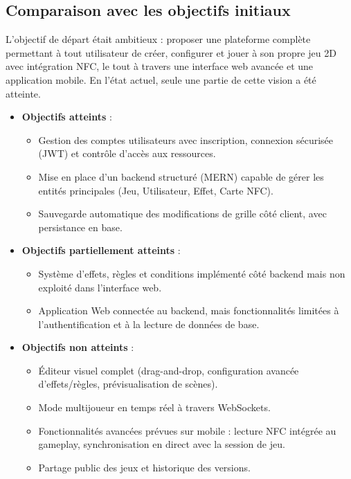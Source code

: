 \documentclass[12pt]{article}        %
\begin{document}
\subsection{Comparaison avec les objectifs initiaux}
\label{subsec:Comparaison}

L’objectif de départ était ambitieux : proposer une plateforme complète permettant à tout utilisateur de créer, configurer et jouer à son propre jeu 2D avec intégration NFC, le tout à travers une interface web avancée et une application mobile.  
En l’état actuel, seule une partie de cette vision a été atteinte.

\begin{itemize}
  \item \textbf{Objectifs atteints} :
  \begin{itemize}
    \item Gestion des comptes utilisateurs avec inscription, connexion sécurisée (JWT) et contrôle d’accès aux ressources.
    \item Mise en place d’un backend structuré (MERN) capable de gérer les entités principales (Jeu, Utilisateur, Effet, Carte NFC).
    \item Sauvegarde automatique des modifications de grille côté client, avec persistance en base.
  \end{itemize}

  \item \textbf{Objectifs partiellement atteints} :
  \begin{itemize}
    \item Système d’effets, règles et conditions implémenté côté backend mais non exploité dans l’interface web.
    \item Application Web connectée au backend, mais fonctionnalités limitées à l’authentification et à la lecture de données de base.
  \end{itemize}

    \item \textbf{Objectifs non atteints} :
  \begin{itemize}
    \item Éditeur visuel complet (drag-and-drop, configuration avancée d’effets/règles, prévisualisation de scènes).
    \item Mode multijoueur en temps réel à travers WebSockets.
    \item Fonctionnalités avancées prévues sur mobile : lecture NFC intégrée au gameplay, synchronisation en direct avec la session de jeu.
    \item Partage public des jeux et historique des versions.
  \end{itemize}
\end{itemize}
\end{document}
